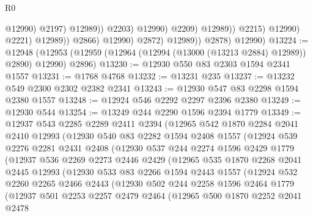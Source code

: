 \begin{lexlean}{R0}
\begin{coremodule}
                                              @12990)
                                            @2197)
                                          @12989))
                                      @2203)
                                    @12990)
                                  @2209)
                                @12989))
                            @2215)
                          @12990)
                        @2221)
                      @12989))
                  @2866)
                @12990)
              @2872)
            @12989))
        @2878)
      @12990)
@13224 := @12948
    (@12953 (@12959 (@12964 (@12994 (@13000 (@13213 @2884) @12989)) @2890) @12990) @2896)
@13230 := @12930 @550 @83 @2303 @1594 @2341 @1557
@13231 := @1768 @4768
@13232 := @13231 @235
@13237 := @13232 @549 @2300 @2302 @2382 @2341
@13243 := @12930 @547 @83 @2298 @1594 @2380 @1557
@13248 := @12924 @546 @2292 @2297 @2396 @2380
@13249 := @12930 @544
@13254 := @13249 @244 @2290 @1596 @2394 @1779
@13349 := @12937
    @543
    @2285
    @2289
    @2411
    @2394
    (@12965
      @542
      @1870
      @2284
      @2041
      @2410
      @12993
      (@12930
        @540
        @83
        @2282
        @1594
        @2408
        @1557
        (@12924
          @539
          @2276
          @2281
          @2431
          @2408
          (@12930
            @537
            @244
            @2274
            @1596
            @2429
            @1779
            (@12937
              @536
              @2269
              @2273
              @2446
              @2429
              (@12965
                @535
                @1870
                @2268
                @2041
                @2445
                @12993
                (@12930
                  @533
                  @83
                  @2266
                  @1594
                  @2443
                  @1557
                  (@12924
                    @532
                    @2260
                    @2265
                    @2466
                    @2443
                    (@12930
                      @502
                      @244
                      @2258
                      @1596
                      @2464
                      @1779
                      (@12937
                        @501
                        @2253
                        @2257
                        @2479
                        @2464
                        (@12965
                          @500
                          @1870
                          @2252
                          @2041
                          @2478

\end{coremodule}
\end{lexlean}
